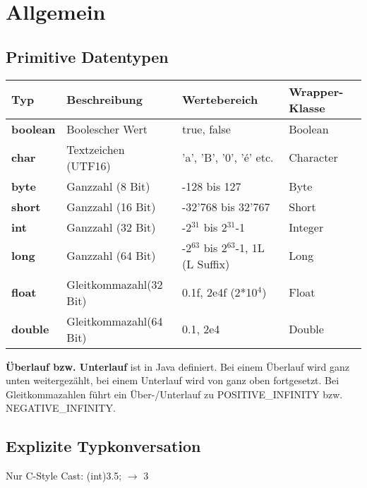 \vspace{-0.5cm}
\section*{Allgemein}
	\begin{minipage}[t]{12.5cm}
		\subsection*{Primitive Datentypen}
			\begin{tabular}{|>{\bfseries}l l l l|}
				\hline Typ & \bfseries{Beschreibung} & \bfseries{Wertebereich} & \bfseries{Wrapper-Klasse}
				\\\hline   boolean & Boolescher Wert & true, false & Boolean
				\\ char & Textzeichen (UTF16) & 'a', 'B', '0', 'é' etc. & Character
				\\ byte & Ganzzahl (8 Bit) & -128 bis 127 & Byte
				\\ short & Ganzzahl (16 Bit) & -32'768 bis 32'767 & Short
				\\ int & Ganzzahl (32 Bit) & -2$^{31}$ bis 2$^{31}$-1 & Integer
				\\ long & Ganzzahl (64 Bit) & -2$^{63}$ bis 2$^{63}$-1, 1L (L Suffix) & Long
				\\ float & Gleitkommazahl(32 Bit) & 0.1f, 2e4f (2*10$^4$) & Float
				\\ double & Gleitkommazahl(64 Bit) & 0.1, 2e4 & Double
				\\\hline
			\end{tabular}
		\end{minipage}
		\hspace*{0.6cm}
		\begin{minipage}[t]{5.7cm}
			\vspace*{0.7cm}
			\textbf{Überlauf bzw. Unterlauf} ist in Java definiert. Bei einem Überlauf wird ganz unten weitergezählt, bei einem Unterlauf wird von ganz oben fortgesetzt. Bei Gleitkommazahlen führt ein Über-/Unterlauf zu POSITIVE\_INFINITY bzw. NEGATIVE\_INFINITY.
			\subsection*{Explizite Typkonversation}
			Nur C-Style Cast: (int)3.5; $\rightarrow$ 3
			\\
		\end{minipage}
	
	\vspace{0.3cm}
